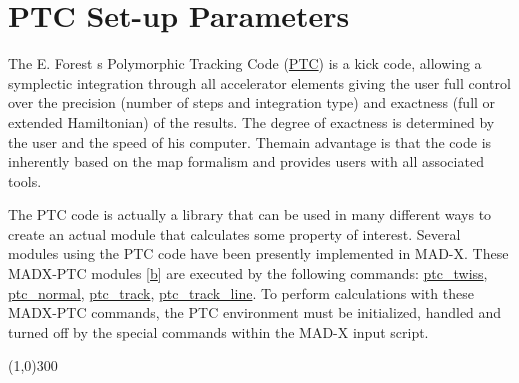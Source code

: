 

%  
% 




\section{PTC Set-up Parameters}

  The E. Forest s Polymorphic Tracking Code (\hyperlink{E.Forest}{PTC})   is a kick code, allowing a symplectic integration through all   accelerator elements giving the user full control over the precision (number of   steps and integration type) and exactness (full or extended Hamiltonian) of the   results. The degree of exactness is determined by the user and the speed of his   computer. The\nolinebreak main advantage is that the code is inherently based on the   map formalism and provides users with all associated tools.

  The PTC code is actually a library that can be used in many different ways to   create an actual module that calculates some property of interest. Several   modules using the PTC code have been presently implemented in MAD-X. These MADX-PTC modules [\hyperlink{F.Schmidt}{b}] are   executed by the following   commands: \href{../ptc_twiss/ptc_twiss.html}{  ptc\_twiss}, \href{../ptc_normal/ptc_normal.html}{  ptc\_normal}, \href{../ptc_track/ptc_track.html}{  ptc\_track},  \href{../ptc_track_line/ptc_track_line.html}{  ptc\_track\_line}. To perform calculations with these MADX-PTC commands, the PTC   environment must be initialized, handled and turned off by the special commands within the MAD-X   input script.

\line(1,0){300}

